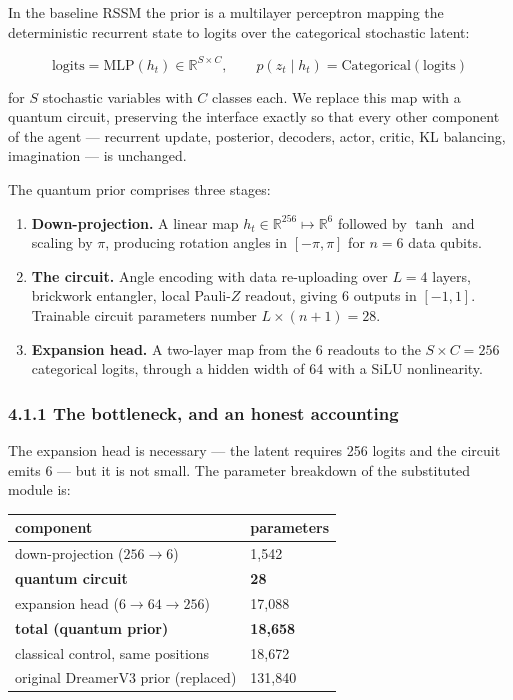 \documentclass[
  11pt]{article}
\providecommand{\tightlist}{%
  \setlength{\itemsep}{0pt}\setlength{\parskip}{0pt}}
\begin{document}
In the baseline RSSM the prior is a multilayer perceptron mapping the
deterministic recurrent state to logits over the categorical stochastic
latent:

\[ \text{logits} = \mathrm{MLP}(h_t) \in \mathbb{R}^{S \times C}, \qquad
   p(z_t \mid h_t) = \mathrm{Categorical}(\text{logits}) \]

for \(S\) stochastic variables with \(C\) classes each. We replace this
map with a quantum circuit, preserving the interface exactly so that
every other component of the agent --- recurrent update, posterior,
decoders, actor, critic, KL balancing, imagination --- is unchanged.

The quantum prior comprises three stages:

\begin{enumerate}
\def\labelenumi{\arabic{enumi}.}
\tightlist
\item
  \textbf{Down-projection.} A linear map
  \(h_t \in \mathbb{R}^{256} \mapsto \mathbb{R}^{6}\) followed by
  \(\tanh\) and scaling by \(\pi\), producing rotation angles in
  \([-\pi, \pi]\) for \(n = 6\) data qubits.
\item
  \textbf{The circuit.} Angle encoding with data re-uploading over
  \(L = 4\) layers, brickwork entangler, local Pauli-\(Z\) readout,
  giving 6 outputs in \([-1, 1]\). Trainable circuit parameters number
  \(L \times (n+1) = 28\).
\item
  \textbf{Expansion head.} A two-layer map from the 6 readouts to the
  \(S \times C = 256\) categorical logits, through a hidden width of 64
  with a SiLU nonlinearity.
\end{enumerate}

\hypertarget{the-bottleneck-and-an-honest-accounting}{%
\subsubsection{4.1.1 The bottleneck, and an honest
accounting}\label{the-bottleneck-and-an-honest-accounting}}

The expansion head is necessary --- the latent requires 256 logits and
the circuit emits 6 --- but it is not small. The parameter breakdown of
the substituted module is:

\begin{longtable}[]{@{}ll@{}}
\toprule
component & parameters\tabularnewline
\midrule
\endhead
down-projection (\(256 \rightarrow 6\)) & 1,542\tabularnewline
\textbf{quantum circuit} & \textbf{28}\tabularnewline
expansion head (\(6 \rightarrow 64 \rightarrow 256\)) &
17,088\tabularnewline
\textbf{total (quantum prior)} & \textbf{18,658}\tabularnewline
classical control, same positions & 18,672\tabularnewline
original DreamerV3 prior (replaced) & 131,840\tabularnewline
\bottomrule
\end{longtable}
\end{document}
